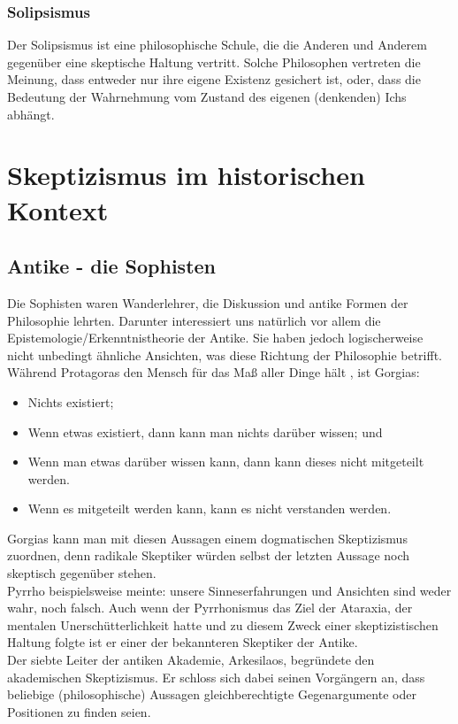 \documentclass[12pt,a4paper]{article}
\begin{document}
		\subsubsection{Solipsismus}
Der Solipsismus ist eine philosophische Schule, die die Anderen und Anderem gegenüber eine skeptische Haltung vertritt. Solche Philosophen vertreten die Meinung, dass entweder nur ihre eigene Existenz gesichert ist, oder, dass die Bedeutung der Wahrnehmung vom Zustand des eigenen (denkenden) Ichs abhängt.%
\section{Skeptizismus im historischen Kontext}
	\subsection{Antike - die Sophisten}
Die Sophisten waren Wanderlehrer, die Diskussion und antike Formen der Philosophie lehrten. Darunter interessiert uns %
natürlich vor allem die Epistemologie/Erkenntnistheorie der Antike. Sie haben jedoch logischerweise nicht unbedingt ähnliche Ansichten, was diese Richtung der Philosophie betrifft. Während Protagoras den Mensch für das Maß aller Dinge hält%
, ist Gorgias:
\begin{itemize}
\item Nichts existiert;
\item Wenn etwas existiert, dann kann man nichts darüber wissen; und
\item Wenn man etwas darüber wissen kann, dann kann dieses nicht mitgeteilt werden.
\item Wenn es mitgeteilt werden kann, kann es nicht verstanden werden.
\end{itemize}%
Gorgias kann man mit diesen Aussagen einem dogmatischen Skeptizismus zuordnen, denn radikale Skeptiker würden selbst der letzten Aussage noch skeptisch gegenüber stehen.\\
Pyrrho beispielsweise meinte: \glqq unsere Sinneserfahrungen und Ansichten sind weder wahr, noch falsch\grqq.%
 Auch wenn der Pyrrhonismus das Ziel der Ataraxia, der mentalen Unerschütterlichkeit hatte und zu diesem Zweck einer skeptizistischen Haltung folgte ist er einer der bekannteren Skeptiker der Antike.%
\\Der siebte Leiter der antiken Akademie, Arkesilaos, begründete den akademischen Skeptizismus. Er schloss sich dabei seinen Vorgängern an, dass beliebige (philosophische) Aussagen gleichberechtigte Gegenargumente oder Positionen zu finden seien.
\end{document}
